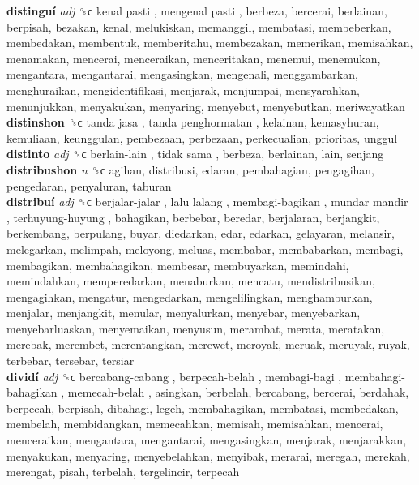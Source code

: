 \textbf{distinguí} \emph{adj}  ␝ϲ   kenal pasti ,  mengenal pasti , berbeza, bercerai, berlainan, berpisah, bezakan, kenal, melukiskan, memanggil, membatasi, membeberkan, membedakan, membentuk, memberitahu, membezakan, memerikan, memisahkan, menamakan, mencerai, menceraikan, menceritakan, menemui, menemukan, mengantara, mengantarai, mengasingkan, mengenali, menggambarkan, menghuraikan, mengidentifikasi, menjarak, menjumpai, mensyarahkan, menunjukkan, menyakukan, menyaring, menyebut, menyebutkan, meriwayatkan  \\
\textbf{distinshon} ␝ϲ   tanda jasa ,  tanda penghormatan , kelainan, kemasyhuran, kemuliaan, keunggulan, pembezaan, perbezaan, perkecualian, prioritas, unggul  \\
\textbf{distinto} \emph{adj}  ␝ϲ   berlain-lain ,  tidak sama , berbeza, berlainan, lain, senjang  \\
\textbf{distribushon} \emph{n}  ␝ϲ  agihan, distribusi, edaran, pembahagian, pengagihan, pengedaran, penyaluran, taburan  \\
\textbf{distribuí} \emph{adj}  ␝ϲ   berjalar-jalar ,  lalu lalang ,  membagi-bagikan ,  mundar mandir ,  terhuyung-huyung , bahagikan, berbebar, beredar, berjalaran, berjangkit, berkembang, berpulang, buyar, diedarkan, edar, edarkan, gelayaran, melansir, melegarkan, melimpah, meloyong, meluas, membabar, membabarkan, membagi, membagikan, membahagikan, membesar, membuyarkan, memindahi, memindahkan, memperedarkan, menaburkan, mencatu, mendistribusikan, mengagihkan, mengatur, mengedarkan, mengelilingkan, menghamburkan, menjalar, menjangkit, menular, menyalurkan, menyebar, menyebarkan, menyebarluaskan, menyemaikan, menyusun, merambat, merata, meratakan, merebak, merembet, merentangkan, merewet, meroyak, meruak, meruyak, ruyak, terbebar, tersebar, tersiar  \\
\textbf{dividí} \emph{adj}  ␝ϲ   bercabang-cabang ,  berpecah-belah ,  membagi-bagi ,  membahagi-bahagikan ,  memecah-belah , asingkan, berbelah, bercabang, bercerai, berdahak, berpecah, berpisah, dibahagi, legeh, membahagikan, membatasi, membedakan, membelah, membidangkan, memecahkan, memisah, memisahkan, mencerai, menceraikan, mengantara, mengantarai, mengasingkan, menjarak, menjarakkan, menyakukan, menyaring, menyebelahkan, menyibak, merarai, meregah, merekah, merengat, pisah, terbelah, tergelincir, terpecah  \\
